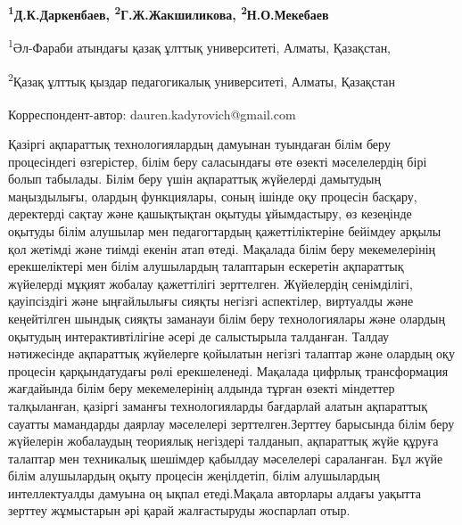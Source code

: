 
\begin{articleheader}

{\bfseries \textsuperscript{1}Д.К.Даркенбаев\textsuperscript{\envelope },
\textsuperscript{2}Г.Ж.Жакшиликова, \textsuperscript{2}Н.О.Мекебаев}
\end{articleheader}

\begin{affiliation}
\textsuperscript{1}Әл-Фараби атындағы қазақ ұлттық университеті, Алматы,
Қазақстан,

\textsuperscript{2}Қазақ ұлттық қыздар педагогикалық университеті,
Алматы, Қазақстан

\raggedright {\bfseries \textsuperscript{\envelope }}Корреспондент-автор: dauren.kadyrovich@gmail.com
\end{affiliation}

Қазіргі ақпараттық технологиялардың дамуынан туындаған білім беру
процесіндегі өзгерістер, білім беру саласындағы өте өзекті мәселелердің
бірі болып табылады. Білім беру үшін ақпараттық жүйелерді дамытудың
маңыздылығы, олардың функциялары, соның ішінде оқу процесін басқару,
деректерді сақтау және қашықтықтан оқытуды ұйымдастыру, өз кезеңінде
оқытуды білім алушылар мен педагогтардың қажеттіліктеріне бейімдеу
арқылы қол жетімді және тиімді екенін атап өтеді. Мақалада білім беру
мекемелерінің ерекшеліктері мен білім алушылардың талаптарын ескеретін
ақпараттық жүйелерді мұқият жобалау қажеттілігі зерттелген. Жүйелердің
сенімділігі, қауіпсіздігі және ыңғайлылығы сияқты негізгі аспектілер,
виртуалды және кеңейтілген шындық сияқты заманауи білім беру
технологиялары және олардың оқытудың интерактивтілігіне әсері де
салыстырыла талданған. Талдау нәтижесінде ақпараттық жүйелерге қойылатын
негізгі талаптар және олардың оқу процесін қарқындатудағы рөлі
ерекшеленеді. Мақалада цифрлық трансформация жағдайында білім беру
мекемелерінің алдында тұрған өзекті міндеттер талқыланған, қазіргі
заманғы технологияларды бағдарлай алатын ақпараттық сауатты мамандарды
даярлау мәселелері зерттелген.Зерттеу барысында білім беру жүйелерін
жобалаудың теориялық негіздері талданып, ақпараттық жүйе құруға талаптар
мен техникалық шешімдер қабылдау мәселелері сараланған. Бұл жүйе білім
алушылардың оқыту процесін жеңілдетіп, білім алушылардың интеллектуалды
дамуына оң ықпал етеді.Мақала авторлары алдағы уақытта зерттеу
жұмыстарын әрі қарай жалғастыруды жоспарлап отыр.

